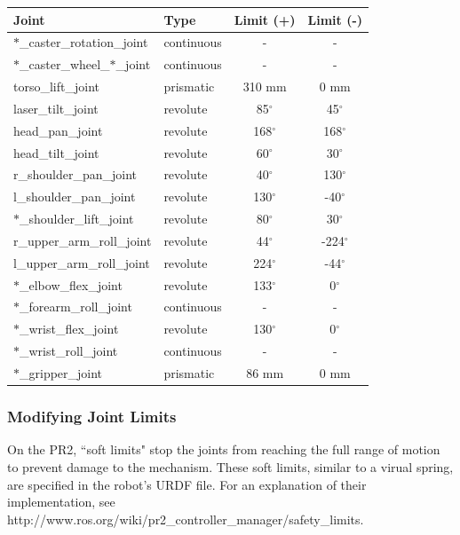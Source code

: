 \begin{tabular}{ll*{2}{c}}
Joint  & Type  & Limit (+) & Limit (-) \\
\hline \hline
$\ast$\_caster\_rotation\_joint        & continuous & -            & - \\
$\ast$\_caster\_wheel\_$\ast$\_joint   & continuous & -            & - \\
torso\_lift\_joint                     & prismatic  & 310 mm       & 0 mm \\
laser\_tilt\_joint                     & revolute   & 85$^\circ$   & 45$^\circ$ \\
head\_pan\_joint                       & revolute   & 168$^\circ$  & 168$^\circ$  \\
head\_tilt\_joint                      & revolute   & 60$^\circ$   & 30$^\circ$  \\
r\_shoulder\_pan\_joint                 & revolute   & 40$^\circ$   & 130$^\circ$  \\
l\_shoulder\_pan\_joint                 & revolute   & 130$^\circ$  & -40$^\circ$  \\
$\ast$\_shoulder\_lift\_joint          & revolute   & 80$^\circ$   & 30$^\circ$  \\
r\_upper\_arm\_roll\_joint              & revolute   & 44$^\circ$   & -224$^\circ$  \\
l\_upper\_arm\_roll\_joint              & revolute   & 224$^\circ$  & -44$^\circ$  \\
$\ast$\_elbow\_flex\_joint             & revolute   & 133$^\circ$  & 0$^\circ$  \\
$\ast$\_forearm\_roll\_joint           & continuous & -            & - \\
$\ast$\_wrist\_flex\_joint             & revolute   & 130$^\circ$  & 0$^\circ$  \\
$\ast$\_wrist\_roll\_joint             & continuous & -            & - \\
$\ast$\_gripper\_joint                 & prismatic  & 86 mm        & 0 mm \\
\end{tabular}

\subsubsection{Modifying Joint Limits}

On the PR2, ``soft limits" stop the joints from reaching the full range of motion to prevent damage to the mechanism. These soft limits, similar to a virual spring, are specified in the robot's URDF file. For an explanation of their implementation, see http://www.ros.org/wiki/pr2\_controller\_manager/safety\_limits.

